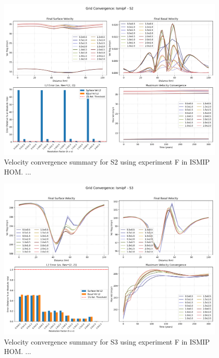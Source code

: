 \begin{figure}[H]
    \includegraphics[scale=0.49]{IsmipF_S2_convergence_summary.png}
    \caption{Velocity convergence summary for S2 using experiment F in ISMIP HOM. ... }
    \label{fig:grid_conv_S2}
\end{figure}


\begin{figure}[H]
    \includegraphics[scale=0.49]{IsmipF_S3_convergence_summary.png}
    \caption{Velocity convergence summary for S3 using experiment F in ISMIP HOM. ... }
    \label{fig:grid_conv_S3}
\end{figure}


